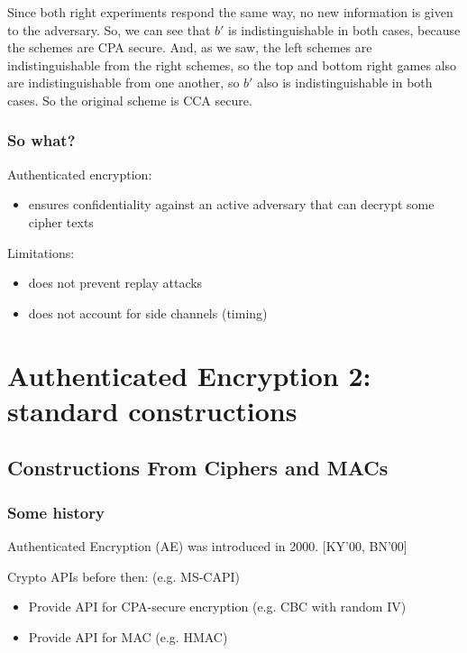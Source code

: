 \documentclass[12pt]{book}
\begin{document}
Since both right experiments respond the same way, no new information is given to the adversary. So, we can see that $b'$ is indistinguishable in both cases, because the schemes are CPA secure. And, as we saw, the left schemes are indistinguishable from the right schemes, so the top and bottom right games also are indistinguishable from one another, so $b'$ also is indistinguishable in both cases. So the original scheme is CCA secure.

\subsubsection{So what?}
Authenticated encryption:
\begin{itemize}
	\item ensures confidentiality against an active adversary that can decrypt some cipher texts
\end{itemize}

Limitations:
\begin{itemize}
	\item does not prevent replay attacks
	\item does not account for side channels (timing)
\end{itemize}

\newpage
\section{Authenticated Encryption 2: standard constructions}
\subsection{Constructions From Ciphers and MACs}
\subsubsection{Some history}
Authenticated Encryption (AE) was introduced in 2000. [KY'00, BN'00]

Crypto APIs before then: (e.g. MS-CAPI)
\begin{itemize}
	\item Provide API for CPA-secure encryption (e.g. CBC with random IV)
	\item Provide API for MAC (e.g. HMAC)
\end{itemize}
\end{document}

